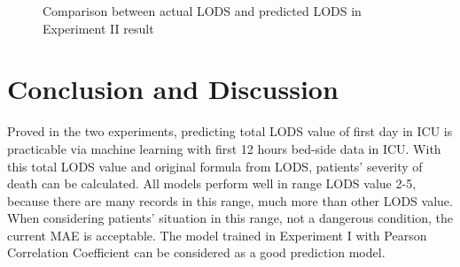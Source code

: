 \documentclass[12pt,a4paper,english
]{tunithesis}
\begin{document}
\begin{figure}
  \begin{center}
    \qquad                        
    \caption[Actual value \& Predicted value]{Comparison between actual LODS and predicted LODS in Experiment II result}

    \label{fig:experiment_2_result}
  \end{center}
\end{figure}


\chapter{Conclusion and Discussion}
\label{ch:conclusion}
Proved in the two experiments, predicting total LODS value of first day in ICU is practicable via machine learning with first 12 hours bed-side data in ICU. With this total LODS value and original formula from LODS, patients' severity of death can be calculated. All models perform well in range LODS value 2-5, because there are many records in this range, much more than other LODS value. When considering patients' situation in this range, not a dangerous condition, the current MAE is acceptable. The model trained in Experiment I with Pearson Correlation Coefficient can be considered as a good prediction model.
\end{document}
